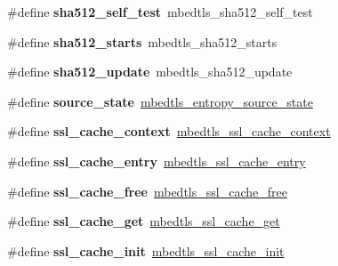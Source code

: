 \begin{DoxyCompactItemize}
\#define {\bfseries sha512\+\_\+self\+\_\+test}~mbedtls\+\_\+sha512\+\_\+self\+\_\+test
\item 
\mbox{\label{compat-1_83_8h_af3292fbe5e1850662d720732cd8b8821}} 
\#define {\bfseries sha512\+\_\+starts}~mbedtls\+\_\+sha512\+\_\+starts
\item 
\mbox{\label{compat-1_83_8h_a2a8143fa7c235edf0d5c9621504121fc}} 
\#define {\bfseries sha512\+\_\+update}~mbedtls\+\_\+sha512\+\_\+update
\item 
\mbox{\label{compat-1_83_8h_a34da83a7bf636b824c297fbef7b82e1c}} 
\#define {\bfseries source\+\_\+state}~\mbox{\hyperlink{structmbedtls__entropy__source__state}{mbedtls\+\_\+entropy\+\_\+source\+\_\+state}}
\item 
\mbox{\label{compat-1_83_8h_a9b52026efb71af4c72380e237ec21e5a}} 
\#define {\bfseries ssl\+\_\+cache\+\_\+context}~\mbox{\hyperlink{structmbedtls__ssl__cache__context}{mbedtls\+\_\+ssl\+\_\+cache\+\_\+context}}
\item 
\mbox{\label{compat-1_83_8h_a2ea683f2f61feb563acc69a157bd6f3b}} 
\#define {\bfseries ssl\+\_\+cache\+\_\+entry}~\mbox{\hyperlink{structmbedtls__ssl__cache__entry}{mbedtls\+\_\+ssl\+\_\+cache\+\_\+entry}}
\item 
\mbox{\label{compat-1_83_8h_ab3f350429a337d80d484c8d155e55c9e}} 
\#define {\bfseries ssl\+\_\+cache\+\_\+free}~\mbox{\hyperlink{ssl__cache_8h_a93a35f5cd109f9d698bfac659905c0d8}{mbedtls\+\_\+ssl\+\_\+cache\+\_\+free}}
\item 
\mbox{\label{compat-1_83_8h_a0aa050ebbbdaa062a4013616cb41d4d6}} 
\#define {\bfseries ssl\+\_\+cache\+\_\+get}~\mbox{\hyperlink{ssl__cache_8h_af0ab0006ecbbec9405be5566ac16c4b3}{mbedtls\+\_\+ssl\+\_\+cache\+\_\+get}}
\item 
\mbox{\label{compat-1_83_8h_a2a494a4736f79180575cedda0d37a188}} 
\#define {\bfseries ssl\+\_\+cache\+\_\+init}~\mbox{\hyperlink{ssl__cache_8h_a90886fd9ad56471c5ebaed2e05086cd5}{mbedtls\+\_\+ssl\+\_\+cache\+\_\+init}}
\item 
\mbox{\label{compat-1_83_8h_add8513a61f25f94277a0e5e2864ae9a8}} 

\end{DoxyCompactItemize}
